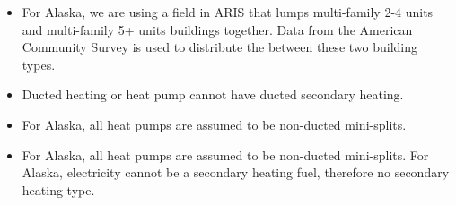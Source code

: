 \begin{itemize}
\item For Alaska, we are using a field in ARIS that lumps multi-family 2-4 units and multi-family 5+ units buildings together. Data from the American Community Survey is used to distribute the between these two building types.
\item Ducted heating or heat pump cannot have ducted secondary heating.
\item For Alaska, all heat pumps are assumed to be non-ducted mini-splits.
\item For Alaska, all heat pumps are assumed to be non-ducted mini-splits. For Alaska, electricity cannot be a secondary heating fuel, therefore no secondary heating type.
\end{itemize}
